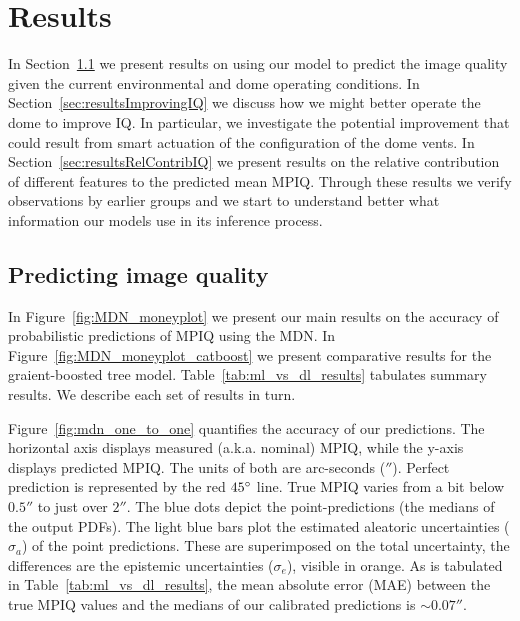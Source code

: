 \section{Results}
\label{sec:results}
In Section~\ref{sec:resultsPredictingIQ} we present results on using our model to predict the image quality given the current environmental and dome operating conditions. In Section~\ref{sec:resultsImprovingIQ} we discuss how we might better operate the dome to improve IQ.  In particular, we investigate the potential improvement that could result from smart actuation of the configuration of the dome vents. In Section~\ref{sec:resultsRelContribIQ} we present results on the relative contribution of different features to the predicted mean MPIQ.  Through these results we verify observations by earlier groups and we start to understand better what information our models use in its inference process.


\subsection{Predicting image quality}
\label{sec:resultsPredictingIQ}

In Figure~\ref{fig:MDN_moneyplot} we present our main results on the accuracy of probabilistic predictions of MPIQ using the MDN.  In Figure~\ref{fig:MDN_moneyplot_catboost} we present comparative results for the graient-boosted tree model.  Table~\ref{tab:ml_vs_dl_results} tabulates summary results.  We describe each set of results in turn.

Figure~\ref{fig:mdn_one_to_one} quantifies the accuracy of our predictions.  The horizontal axis displays measured (a.k.a. nominal) MPIQ, while the y-axis displays predicted MPIQ.  The units of both are arc-seconds ($''$). Perfect prediction is represented by the red $45\degree$  line. True MPIQ varies from a bit below $0.5''$ to just over $2''$.  The blue dots depict the point-predictions (the medians of the output PDFs).  The light blue bars plot the estimated aleatoric uncertainties ($\sigma_a$) of the point predictions.  These are superimposed on the total uncertainty, the differences are the epistemic uncertainties ($\sigma_e$), visible in orange.   
As is tabulated in Table~\ref{tab:ml_vs_dl_results}, the mean absolute error (MAE) between the true MPIQ values and the medians of our calibrated predictions is $\sim 0.07''$. 

